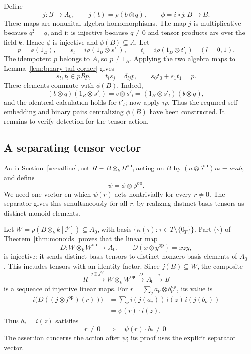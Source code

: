 Define
\[
 j:B\longrightarrow A_0,\qquad j(b)=\rho(b\otimes q),
 \qquad \phi=i\circ j:B\longrightarrow B.
\]
These maps are nonunital algebra homomorphisms.  The map \(j\) is multiplicative because \(q^2=q\), and it is injective
because \(q\ne0\) and tensor products are over the field \(k\).
Hence \(\phi\) is injective and \(\phi(B)\subseteq A\).  Let
\[
 p=\phi(1_B),\qquad
 s_l=i\rho(1_B\otimes s'_l),\qquad
 t_l=i\rho(1_B\otimes t'_l)\quad(l=0,1).
\]
The idempotent \(p\) belongs to \(A\), so \(p\ne1_B\).
Applying the two algebra maps to Lemma~\ref{lem:binary-tail-corner}
gives
\begin{equation}\label{eq:B-corner-pairs}
 s_l,t_l\in pBp,\qquad
 t_ls_j=\delta_{lj}p,\qquad s_0t_0+s_1t_1=p.
\end{equation}
These elements commute with \(\phi(B)\).  Indeed,
\[
 (b\otimes q)(1_B\otimes s'_l)=b\otimes s'_l
   =(1_B\otimes s'_l)(b\otimes q),
\]
and the identical calculation holds for \(t'_l\); now apply
\(i\rho\). Thus the required self-embedding and binary pairs
centralizing \(\phi(B)\) have been constructed. It remains to verify detection
for the tensor action.

\subsection{A separating tensor vector}

As in Section~\ref{sec:affine}, set \(R=B\otimes_k B^{\mathrm{op}}\),
acting on \(B\) by \((a\otimes b^{\mathrm{op}})m=amb\), and define
\[
 \psi=\phi\otimes\phi^{\mathrm{op}}.
\]
We need one vector on which \(\psi(r)\) acts nontrivially for every
\(r\ne0\). The separator gives this simultaneously for all
\(r\), by realizing distinct basis tensors as distinct monoid elements.

Let \(W=\rho(B\otimes_k k[\mathcal P])\subseteq A_0\), with basis
\(\{\kappa(\tau):\tau\in T\setminus\{0_T\}\}\).  Part (v) of
Theorem~\ref{thm:monoids} proves that the linear map
\[
 D:W\otimes_k W^{\mathrm{op}}\longrightarrow A_0,
 \qquad D(x\otimes y^{\mathrm{op}})=xzy,
\]
is injective: it sends distinct basis tensors to distinct nonzero basis
elements of \(A_0\).  This includes tensors with an identity factor.
Since \(j(B)\subseteq W\), the composite
\[
 R\xrightarrow{\ j\otimes j^{\mathrm{op}}\ }
 W\otimes_k W^{\mathrm{op}}
 \xrightarrow{\ D\ } A_0
 \xrightarrow{\ i\ } B
\]
is a sequence of injective linear maps.  For
\(r=\sum_{\nu}a_{\nu}\otimes b_{\nu}^{\mathrm{op}}\),
its value is
\[
 \begin{aligned}
 i\bigl(D((j\otimes j^{\mathrm{op}})(r))\bigr)
   &=\sum_{\nu}i(j(a_{\nu}))\,i(z)\,i(j(b_{\nu}))\\
   &=\psi(r)\cdot i(z).
 \end{aligned}
\]
Thus \(b_*=i(z)\) satisfies
\begin{equation}\label{eq:tensor-detection}
 r\ne0\quad\Longrightarrow\quad\psi(r)\cdot b_*\ne0.
\end{equation}
The assertion concerns the action after \(\psi\); its proof uses the
explicit separator vector.

